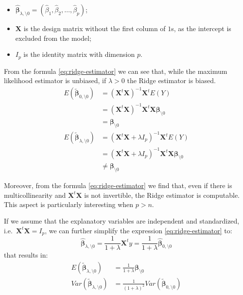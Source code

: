 \documentclass[a4paper, nobind]{templates/ociamthesis}
\providecommand{\tightlist}{%
  \setlength{\itemsep}{0pt}\setlength{\parskip}{0pt}}
\theoremstyle{definition}
\theoremstyle{definition}
\theoremstyle{definition}
\theoremstyle{remark}
\begin{document}
\begin{itemize}
\tightlist
\item
  \(\hat{\boldsymbol{\beta}}_{\lambda,\setminus0} = \left(\hat{\beta}_1, \hat{\beta}_2, \dots, \hat{\beta}_p\right)\);
\item
  \(\boldsymbol{X}\) is the design matrix without the first column of \(1\)s, as the intercept is excluded from the model;
\item
  \(I_p\) is the identity matrix with dimension \(p\).
\end{itemize}

From the formula \eqref{eq:ridge-estimator} we can see that, while the maximum likelihood estimator is unbiased, if \(\lambda>0\) the Ridge estimator is biased.
\begin{align*}
E\left(\tilde{\boldsymbol{\beta}}_{0,\setminus0}\right) & =
\left(\boldsymbol{X}^t\boldsymbol{X}\right)^{-1}\boldsymbol{X}^t E(Y) \\ & =
\left(\boldsymbol{X}^t\boldsymbol{X}\right)^{-1}\boldsymbol{X}^t \boldsymbol{X} \boldsymbol{\beta}_{\setminus0} \\ & =
\boldsymbol{\beta}_{\setminus0} \\[6pt]
E\left(\tilde{\boldsymbol{\beta}}_{\lambda,\setminus0}\right) & =
\left(\boldsymbol{X}^t\boldsymbol{X}+\lambda I_p\right)^{-1}\boldsymbol{X}^t E(Y) \\ & =
\left(\boldsymbol{X}^t\boldsymbol{X}+\lambda I_p\right)^{-1}\boldsymbol{X}^t\boldsymbol{X} \boldsymbol{\beta}_{\setminus0} \\ & \neq
\boldsymbol{\beta}_{\setminus0}
\end{align*}

Moreover, from the formula \eqref{eq:ridge-estimator} we find that, even if there is multicollinearity and \(\boldsymbol{X}^t\boldsymbol{X}\) is not invertible, the Ridge estimator is computable. This aspect is particularly interesting when \(p > n\).

If we assume that the explanatory variables are independent and standardized, i.e.~\(\boldsymbol{X}^t\boldsymbol{X} = I_p\), we can further simplify the expression \eqref{eq:ridge-estimator} to:
\[
\hat{\boldsymbol{\beta}}_{\lambda,\setminus0} =
\frac{1}{1+\lambda} \boldsymbol{X}^t y = 
\frac{1}{1+\lambda} \hat{\boldsymbol{\beta}}_{0,\setminus0}
\]
that results in:
\begin{align*}
E\left(\tilde{\boldsymbol{\beta}}_{\lambda,\setminus0}\right) & =
\frac{1}{1+\lambda} \boldsymbol{\beta}_{\setminus0} \\
Var\left(\tilde{\boldsymbol{\beta}}_{\lambda,\setminus0} \right) & =
\frac{1}{\left(1+\lambda\right)^2} Var\left( \tilde{\boldsymbol{\beta}}_{0,\setminus0} \right)
\end{align*}
\end{document}
